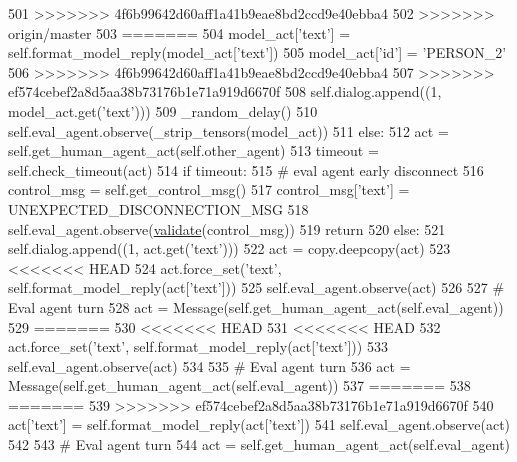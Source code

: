 \begin{DoxyCode}
501 >>>>>>> 4f6b99642d60aff1a41b9eae8bd2ccd9e40ebba4
502 >>>>>>> origin/master
503 =======
504                 model\_act[\textcolor{stringliteral}{'text'}] = self.format\_model\_reply(model\_act[\textcolor{stringliteral}{'text'}])
505                 model\_act[\textcolor{stringliteral}{'id'}] = \textcolor{stringliteral}{'PERSON\_2'}
506 >>>>>>> 4f6b99642d60aff1a41b9eae8bd2ccd9e40ebba4
507 >>>>>>> ef574cebef2a8d5aa38b73176b1e71a919d6670f
508                 self.dialog.append((1, model\_act.get(\textcolor{stringliteral}{'text'})))
509                 \_random\_delay()
510                 self.eval\_agent.observe(\_strip\_tensors(model\_act))
511             \textcolor{keywordflow}{else}:
512                 act = self.get\_human\_agent\_act(self.other\_agent)
513                 timeout = self.check\_timeout(act)
514                 \textcolor{keywordflow}{if} timeout:
515                     \textcolor{comment}{# eval agent early disconnect}
516                     control\_msg = self.get\_control\_msg()
517                     control\_msg[\textcolor{stringliteral}{'text'}] = UNEXPECTED\_DISCONNECTION\_MSG
518                     self.eval\_agent.observe(\hyperlink{namespaceparlai_1_1core_1_1worlds_afc3fad603b7bce41dbdc9cdc04a9c794}{validate}(control\_msg))
519                     \textcolor{keywordflow}{return}
520                 \textcolor{keywordflow}{else}:
521                     self.dialog.append((1, act.get(\textcolor{stringliteral}{'text'})))
522                     act = copy.deepcopy(act)
523 <<<<<<< HEAD
524                     act.force\_set(\textcolor{stringliteral}{'text'}, self.format\_model\_reply(act[\textcolor{stringliteral}{'text'}]))
525                     self.eval\_agent.observe(act)
526 
527         \textcolor{comment}{# Eval agent turn}
528         act = Message(self.get\_human\_agent\_act(self.eval\_agent))
529 =======
530 <<<<<<< HEAD
531 <<<<<<< HEAD
532                     act.force\_set(\textcolor{stringliteral}{'text'}, self.format\_model\_reply(act[\textcolor{stringliteral}{'text'}]))
533                     self.eval\_agent.observe(act)
534 
535         \textcolor{comment}{# Eval agent turn}
536         act = Message(self.get\_human\_agent\_act(self.eval\_agent))
537 =======
538 =======
539 >>>>>>> ef574cebef2a8d5aa38b73176b1e71a919d6670f
540                     act[\textcolor{stringliteral}{'text'}] = self.format\_model\_reply(act[\textcolor{stringliteral}{'text'}])
541                     self.eval\_agent.observe(act)
542 
543         \textcolor{comment}{# Eval agent turn}
544         act = self.get\_human\_agent\_act(self.eval\_agent)

\end{DoxyCode}

